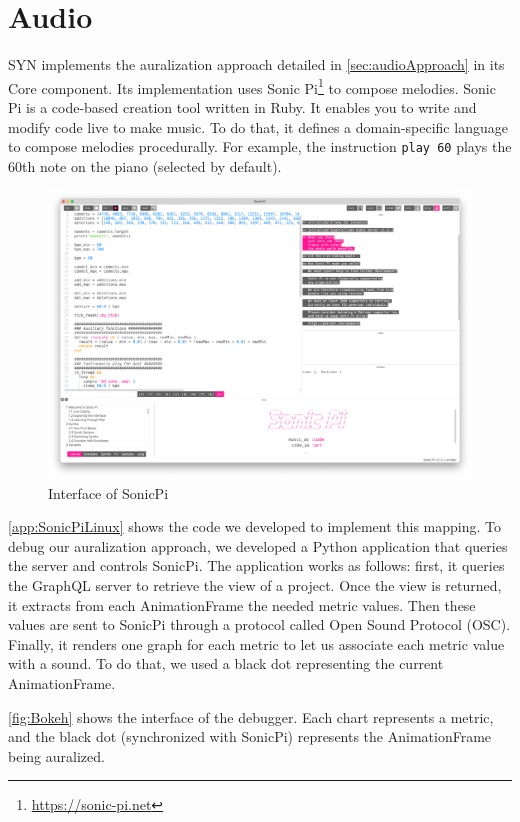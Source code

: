 \section{Audio}
SYN implements the auralization approach detailed in \autoref{sec:audioApproach} in its Core component. 
Its implementation uses Sonic Pi\footnote{\url{https://sonic-pi.net}} to compose melodies. Sonic Pi is a code-based creation tool written in Ruby. It enables you to write and modify code live to make music. To do that, it defines a domain-specific language to compose melodies procedurally. For example, the instruction \texttt{play 60} plays the 60th note on the piano (selected by default). 

\begin{figure}
    \center
    \includegraphics[width=\textwidth]{SonicPi.png}
    \caption{Interface of SonicPi}
    \label{fig:sonicpi}
\end{figure}

\autoref{app:SonicPiLinux} shows the code we developed to implement this mapping. To debug our auralization approach, we developed a Python application that queries the server and controls SonicPi. The application works as follows: first, it queries the GraphQL server to retrieve the view of a project. Once the view is returned, it extracts from each AnimationFrame the needed metric values. Then these values are sent to SonicPi through a protocol called Open Sound Protocol (OSC). Finally, it renders one graph for each metric to let us associate each metric value with a sound. To do that, we used a black dot representing the current AnimationFrame. 

\autoref{fig:Bokeh} shows the interface of the debugger. Each chart represents a metric, and the black dot (synchronized with SonicPi) represents the AnimationFrame being auralized. 

